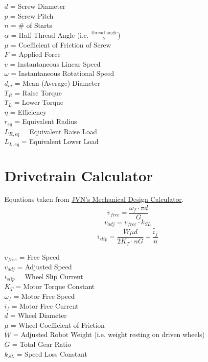 \documentclass[11pt,a4paper,titlepage]{article}
\begin{document}
	$d$ = Screw Diameter \\
	$p$ = Screw Pitch \\
	$n$ = \# of Starts \\
	$\alpha$ = Half Thread Angle (i.e. $\frac{\text{thread angle}}{2}$) \\
	$\mu$ = Coefficient of Friction of Screw \\
	$F$ = Applied Force \\
	$v$ = Instantaneous Linear Speed \\
	$\omega$ = Instantaneous Rotational Speed \\
	$d_m$ = Mean (Average) Diameter \\
	$T_R$ = Raise Torque \\
	$T_L$ = Lower Torque \\
	$\eta$ = Efficiency \\
	$r_{eq}$ = Equivalent Radius \\
	$L_{R,eq}$ = Equivalent Raise Load \\
	$L_{L,eq}$ = Equivalent Lower Load
	
	\section{Drivetrain Calculator}
	
	Equations taken from \href{https://www.chiefdelphi.com/uploads/default/original/3X/2/b/2bf9206b962f74ed5556a0ae936ef0bf365ac975.xlsx}{JVN's Mechanical Design Calculator}.
	\begin{equation}
		v_{free} = \frac{\tilde{\omega_f} \cdot \pi d}{G}
	\end{equation}
	\begin{equation}
		v_{adj} = v_{free} \cdot k_{SL}
	\end{equation}
	\begin{equation}
		i_{slip} = \frac{\tilde{W} \mu d}{2 K_T \cdot n G} + \frac{\tilde{i_f}}{n}
	\end{equation}
	
	$v_{free}$ = Free Speed \\
	$v_{adj}$ = Adjusted Speed \\
	$i_{slip}$ = Wheel Slip Current \\
	$K_T$ = Motor Torque Constant \\
	$\omega_f$ = Motor Free Speed \\
	$i_f$ = Motor Free Current \\
	$d$ = Wheel Diameter \\
	$\mu$ = Wheel Coefficient of Friction \\
	$\tilde{W}$ = Adjusted Robot Weight (i.e. weight resting on driven wheels) \\
	$G$ = Total Gear Ratio \\
	$k_{SL}$ = Speed Loss Constant
	
\end{document}
